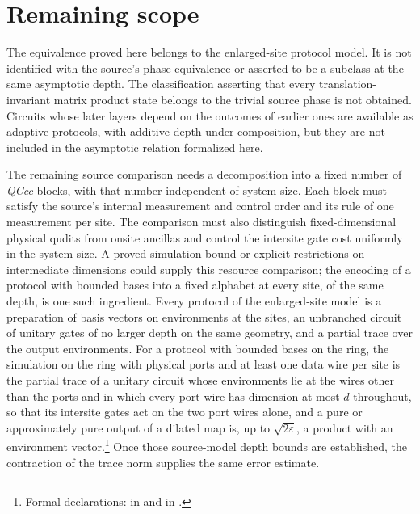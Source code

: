 \documentclass{article}
\begin{document}
\section{Remaining scope}
The equivalence proved here belongs to the enlarged-site protocol model. It
is not identified with the source's phase equivalence or asserted to be a
subclass at the same asymptotic depth. The classification asserting that
every translation-invariant matrix product state belongs to the trivial
source phase is not obtained. Circuits whose later layers depend on the
outcomes of earlier ones are available as adaptive protocols, with additive
depth under composition, but they are not included in the asymptotic
relation formalized here.

The remaining source comparison needs a decomposition into a fixed number
of \textit{QCcc} blocks, with that number independent of system size. Each
block must satisfy the source's internal measurement and control order and
its rule of one measurement per site. The comparison must also distinguish
fixed-dimensional physical qudits from onsite ancillas and control the
intersite gate cost uniformly in the system size. A proved simulation bound
or explicit restrictions on intermediate dimensions could supply this
resource comparison; the encoding of a protocol with bounded bases into a
fixed alphabet at every site, of the same depth, is one such ingredient. Every
protocol of the enlarged-site model is a preparation of basis vectors on
environments at the sites, an unbranched circuit of unitary gates of no larger
depth on the same geometry, and a partial trace over the output environments.
For a protocol with bounded bases on the ring, the simulation on the ring
with physical ports and at least one data wire per site is the partial trace
of a unitary circuit whose
environments lie at the wires other than the ports and in which every port
wire has dimension at most $d$ throughout, so that its intersite gates act on
the two port wires alone, and a pure or
approximately pure output of a dilated map is, up to $\sqrt{2\varepsilon}$, a
product with an environment vector.\footnote{Formal declarations:
     in
     and
     in
    .} Once
those source-model depth bounds are established, the contraction of the
trace norm supplies the same error estimate.



\end{document}
